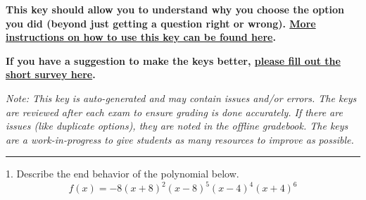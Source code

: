 \documentclass{extbook}[14pt]
\begin{document}
\textbf{This key should allow you to understand why you choose the option you did (beyond just getting a question right or wrong). \href{https://xronos.clas.ufl.edu/mac1105spring2020/courseDescriptionAndMisc/Exams/LearningFromResults}{More instructions on how to use this key can be found here}.}

\textbf{If you have a suggestion to make the keys better, \href{https://forms.gle/CZkbZmPbC9XALEE88}{please fill out the short survey here}.}

\textit{Note: This key is auto-generated and may contain issues and/or errors. The keys are reviewed after each exam to ensure grading is done accurately. If there are issues (like duplicate options), they are noted in the offline gradebook. The keys are a work-in-progress to give students as many resources to improve as possible.}

\rule{\textwidth}{0.4pt}

1. Describe the end behavior of the polynomial below.
\[ f(x) = -8(x + 8)^{2}(x - 8)^{5}(x - 4)^{4}(x + 4)^{6} \] 
\end{document}
